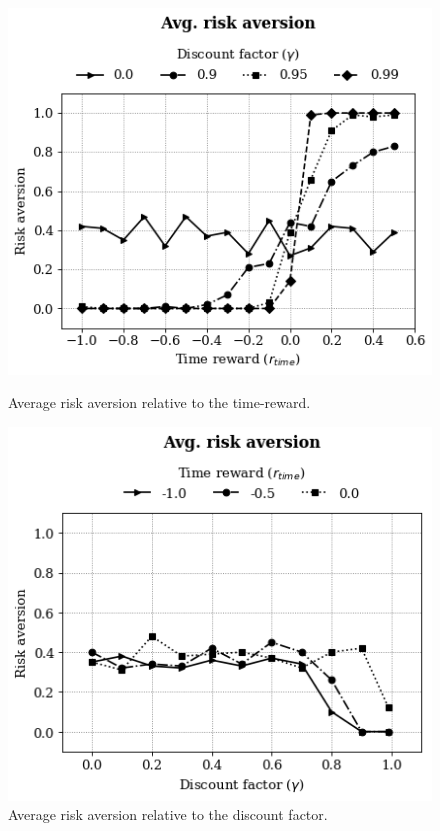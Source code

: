 \begin{figure}[H]
\centering
\begin{minipage}[t]{.5\textwidth}
  \centering
  \includegraphics[width=\linewidth]{imgs/exp-1-risk-rwdt.png}
  \caption[Average risk aversion relative to the time-reward]{Average risk aversion relative to the time-reward.}
  \label{fig:exp-1-risk-rwdt}
\end{minipage}%
\begin{minipage}[t]{.5\textwidth}
  \centering
  \includegraphics[width=\linewidth]{imgs/exp-1-risk-disc.png}
  \caption[Average risk aversion relative to the discount factor]{Average risk aversion relative to the discount factor.}
  \label{fig:exp-1-risk-disc} 
\end{minipage}
\end{figure}

